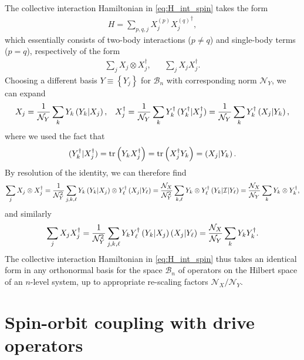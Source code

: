 \documentclass[nofootinbib,notitlepage,11pt]{revtex4-2}
\newcommand{\f}[2]{\dfrac{#1}{#2}} %
\newcommand{\p}[1]{\left(#1\right)} %
\renewcommand{\set}[1]{\left\{#1\right\}} %
\newcommand{\1}{\mathds{1}}
\newcommand{\B}{\mathcal{B}}
\newcommand{\I}{\mathcal{I}}
\newcommand{\N}{\mathcal{N}}
\def\obk#1{\mathinner{({#1})}}
\begin{document}
The collective interaction Hamiltonian in \eqref{eq:H_int_spin} takes
the form
\begin{align}
  H = \sum_{p,q,j} X_j^{(p)} {X_j^{(q)}}^\dag,
\end{align}
which essentially consists of two-body interactions ($p\ne q$) and
single-body terms ($p=q$), respectively of the form
\begin{align}
  \sum_j X_j \otimes X_j^\dag,
  &&
  \sum_j X_j X_j^\dag.
\end{align}
Choosing a different basis $Y\equiv\set{Y_j}$ for $\B_n$ with
corresponding norm $\N_Y$, we can expand
\begin{align}
  X_j = \f1{\N_Y} \sum_k Y_k \obk{Y_k|X_j},
  &&
  X_j^\dag = \f1{\N_Y} \sum_k Y_k^\dag \obk{Y_k^\dag|X_j^\dag}
  = \f1{\N_Y} \sum_k Y_k^\dag \obk{X_j|Y_k},
\end{align}
where we used the fact that
\begin{align}
  \obk{Y_k^\dag|X_j^\dag}
  = \tr\p{Y_k X_j^\dag}
  = \tr\p{X_j^\dag Y_k}
  = \obk{X_j|Y_k}.
\end{align}
By resolution of the identity, we can therefore find
\begin{align}
  \sum_j X_j \otimes X_j^\dag
  = \f1{\N_Y^2} \sum_{j,k,\ell} Y_k \obk{Y_k|X_j}
  \otimes Y_\ell^\dag \obk{X_j|Y_\ell}
  = \f{\N_X}{\N_Y^2} \sum_{k,\ell} Y_k \otimes Y_\ell^\dag
  \obk{Y_k|\I|Y_\ell}
  = \f{\N_X}{\N_Y} \sum_k Y_k \otimes Y_k^\dag,
\end{align}
and similarly
\begin{align}
  \sum_j X_j X_j^\dag
  = \f1{\N_Y^2} \sum_{j,k,\ell} Y_k Y_\ell^\dag
  \obk{Y_k|X_j} \obk{X_j|Y_\ell}
  = \f{\N_X}{\N_Y} \sum_k Y_k Y_k^\dag.
\end{align}
The collective interaction Hamiltonian in \eqref{eq:H_int_spin} thus
takes an identical form in any orthonormal basis for the space $\B_n$
of operators on the Hilbert space of an $n$-level system, up to
appropriate re-scaling factors $\N_X/\N_Y$.

\section{Spin-orbit coupling with drive operators}
\label{sec:lat_drive}
\end{document}
